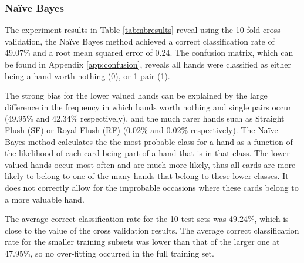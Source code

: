 \documentclass[10pt, a4paper]{article}
\begin{document}
\subsubsection*{Na\"ive Bayes}

The experiment results in Table \ref{tab:nbresults} reveal using the 10-fold cross-validation, the Na\"ive Bayes method achieved a correct classification rate of 49.07\% and a root mean squared error of 0.24. The confusion matrix, which can be found in  Appendix \ref{app:confusion}, reveals all hands were classified as either being a hand worth nothing (0), or 1 pair (1). 

The strong bias for the lower valued hands can be explained by the large difference in the frequency in which hands worth nothing and single pairs occur (49.95\% and 42.34\% respectively), and the much rarer hands such as Straight Flush (SF) or Royal Flush (RF) (0.02\% and 0.02\% respectively). The Na\"ive Bayes method calculates the the most probable class for a hand as a function of the likelihood of each card being part of a hand that is in that class. The lower valued hands occur most often and are much more likely, thus all cards are more likely to belong to one of the many hands that belong to these lower classes. It does not correctly allow for the improbable occasions where these cards belong to a more valuable hand.

The average correct classification rate for the 10 test sets was 49.24\%, which is close to the value of the cross validation results. The average correct classification rate for the smaller training subsets was lower than that of the larger one at 47.95\%, so no over-fitting occurred in the full training set. 
\end{document}
